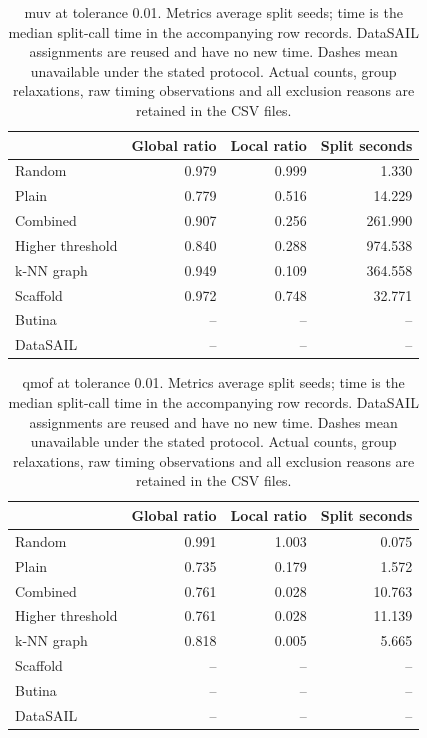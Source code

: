 \begin{table}[htbp]\centering\small
\begin{tabular}{lrrr}
\toprule
 & Global ratio & Local ratio & Split seconds \\
\midrule
Random & 0.979 & 0.999 & 1.330 \\
Plain & 0.779 & 0.516 & 14.229 \\
Combined & 0.907 & 0.256 & 261.990 \\
Higher threshold & 0.840 & 0.288 & 974.538 \\
k-NN graph & 0.949 & 0.109 & 364.558 \\
Scaffold & 0.972 & 0.748 & 32.771 \\
Butina & -- & -- & -- \\
DataSAIL & -- & -- & -- \\
\bottomrule
\end{tabular}

\caption{muv at tolerance 0.01. Metrics average split seeds; time is the median split-call time in the accompanying row records. DataSAIL assignments are reused and have no new time. Dashes mean unavailable under the stated protocol. Actual counts, group relaxations, raw timing observations and all exclusion reasons are retained in the CSV files.}\end{table}
\begin{table}[htbp]\centering\small
\begin{tabular}{lrrr}
\toprule
 & Global ratio & Local ratio & Split seconds \\
\midrule
Random & 0.991 & 1.003 & 0.075 \\
Plain & 0.735 & 0.179 & 1.572 \\
Combined & 0.761 & 0.028 & 10.763 \\
Higher threshold & 0.761 & 0.028 & 11.139 \\
k-NN graph & 0.818 & 0.005 & 5.665 \\
Scaffold & -- & -- & -- \\
Butina & -- & -- & -- \\
DataSAIL & -- & -- & -- \\
\bottomrule
\end{tabular}

\caption{qmof at tolerance 0.01. Metrics average split seeds; time is the median split-call time in the accompanying row records. DataSAIL assignments are reused and have no new time. Dashes mean unavailable under the stated protocol. Actual counts, group relaxations, raw timing observations and all exclusion reasons are retained in the CSV files.}\end{table}
